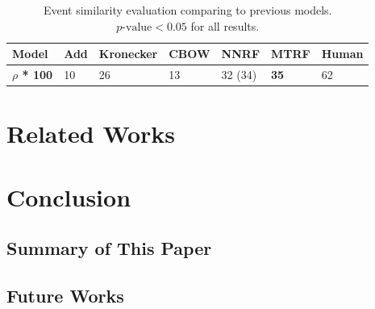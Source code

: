 \documentclass[a4paper]{article}
\begin{document}
\begin{table}[t]
\centering
\begin{tabular}{l||lll|ll|l}
\textbf{Model}          &   Add &   Kronecker   &   CBOW    &   NNRF    &   MTRF        &   Human   \\ \hline
\textbf{$\rho$ * 100}   &   10  &   26          &   13      &   32 (34) &   \textbf{35} &   62      \\
\end{tabular}
\caption{\label{tab:GS_mtrf} Event similarity evaluation comparing to previous models. $p\text{-value} < 0.05$ for all results. }
\end{table}


\section{Related Works}



\section{Conclusion} 
\subsection{Summary of This Paper} 



\subsection{Future Works}



\newpage




\end{document}
